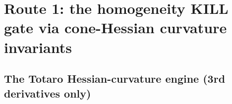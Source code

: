 %
%
%

\section{Route 1: the homogeneity KILL gate via cone-Hessian curvature invariants}

\subsection{The Totaro Hessian-curvature engine (3rd derivatives only)}
\label{sec:totaro-engine}

